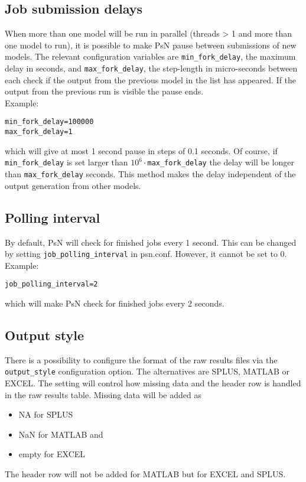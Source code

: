 \subsection{Job submission delays}
When more than one model will be run in parallel (threads > 1 and more than one model to run), it is possible to
make PsN pause between submissions of new models. The relevant configuration variables are
\verb|min_fork_delay|, the maximum delay in seconds, and \verb|max_fork_delay|, the step-length in micro-seconds between each check if the output from the previous model in the list has appeared.
If the output from the previous run is visible the pause ends.\\
Example:
\begin{verbatim}
min_fork_delay=100000
max_fork_delay=1
\end{verbatim}
which will give at most 1 second pause in steps of 0.1 seconds. Of course, if \verb|min_fork_delay| is set larger than
$10^6\cdot$\verb|max_fork_delay| the delay will be longer than \verb|max_fork_delay| seconds. This method makes
the delay independent of the output generation from other models.

\subsection{Polling interval}
By default, PsN will check for finished jobs every 1 second. This can be changed by setting \verb|job_polling_interval| in psn.conf. However, it cannot be set to 0.
Example:
\begin{verbatim}
job_polling_interval=2
\end{verbatim}
which will make PsN check for finished jobs every 2 seconds.

\subsection{Output style}
There is a possibility to configure the format of the raw results files via the \verb|output_style| configuration option. The alternatives are SPLUS, MATLAB or EXCEL. The setting will control how missing data and the header row is handled in the raw results table. Missing data will be added as 
\begin{itemize}
\item NA for SPLUS
\item NaN for MATLAB 
and 
\item empty for EXCEL 
\end{itemize}
The header row will not be added for MATLAB but for EXCEL and SPLUS.



